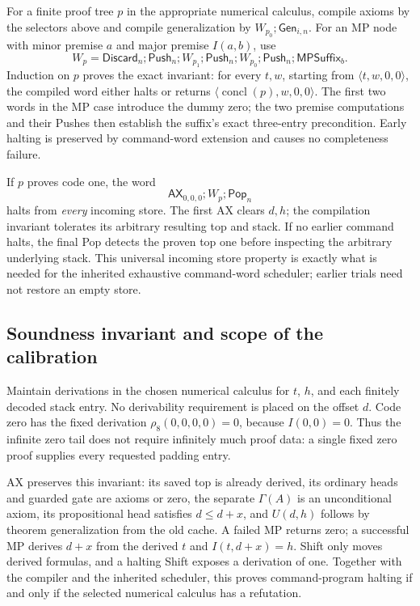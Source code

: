For a finite proof tree $p$ in the appropriate numerical calculus, compile
axioms by the selectors above and compile generalization by
$W_{p_0};\mathsf{Gen}_{i,n}$. For an MP node with minor premise $a$ and
major premise $I(a,b)$, use
\[
 W_p=\mathsf{Discard}_n;\mathsf{Push}_n;
 W_{p_1};\mathsf{Push}_n;
 W_{p_0};\mathsf{Push}_n;\mathsf{MPSuffix}_b.
\]
Induction on $p$ proves the exact invariant:
for every $t,w$, starting from $\langle t,w,0,0\rangle$, the compiled
word either halts or returns $\langle\operatorname{concl}(p),w,0,0\rangle$.
The first two words in the MP case introduce the dummy zero; the two
premise computations and their Pushes then establish the suffix's exact
three-entry precondition. Early halting is preserved by command-word
extension and causes no completeness failure.

If $p$ proves code one, the word
\[
 \mathsf{AX}_{0,0,0};W_p;\mathsf{Pop}_n
\]
halts from \emph{every} incoming store. The first AX clears $d,h$;
the compilation invariant tolerates its arbitrary resulting top and stack.
If no earlier command halts, the final Pop detects the proven top one
before inspecting the arbitrary underlying stack. This universal incoming
store property is exactly what is needed for the inherited exhaustive
command-word scheduler; earlier trials need not restore an empty store.

\subsection{Soundness invariant and scope of the calibration}

Maintain derivations in the chosen numerical calculus for $t$, $h$,
and each finitely decoded stack entry. No derivability requirement is
placed on the offset $d$. Code zero has the fixed derivation
$\rho_8(0,0,0,0)=0$, because $I(0,0)=0$. Thus the infinite zero tail
does not require infinitely much proof data: a single fixed zero proof
supplies every requested padding entry.

AX preserves this invariant: its saved top is already derived, its
ordinary heads and guarded gate are axioms or zero, the separate
$\Gamma(A)$ is an unconditional axiom, its propositional head satisfies
$d\le d+x$, and $U(d,h)$ follows by theorem generalization from the old
cache. A failed MP returns zero; a successful MP derives $d+x$ from the
derived $t$ and $I(t,d+x)=h$. Shift only moves derived formulas, and a
halting Shift exposes a derivation of one. Together with the compiler and
the inherited scheduler, this proves command-program halting if and only
if the selected numerical calculus has a refutation.

